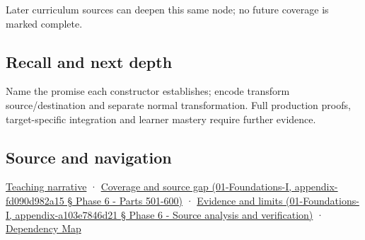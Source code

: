 Later curriculum sources can deepen this same node; no future coverage is marked complete.

\subsection{Recall and next depth}\label{recall-and-next-depth}

Name the promise each constructor establishes; encode transform source/destination and separate normal transformation. Full production proofs, target-specific integration and learner mastery require further evidence.

\subsection{Source and navigation}\label{source-and-navigation}

\href{Continuous\%20Notes/Computing\%20Foundations\%20-\%20From\%20Bits\%20to\%20C++\%20and\%20Systems\%20APIs\#Types\%20can\%20remember\%20the\%20promises\%20that\%20three\%20components\%20forget}{Teaching narrative} · \href{}{Coverage and source gap (01-Foundations-I, appendix-fd090d982a15 § Phase 6 - Parts 501-600)} · \href{}{Evidence and limits (01-Foundations-I, appendix-a103e7846d21 § Phase 6 - Source analysis and verification)} · \hyperref[appendix-4ad47bdd269a]{Dependency Map}

